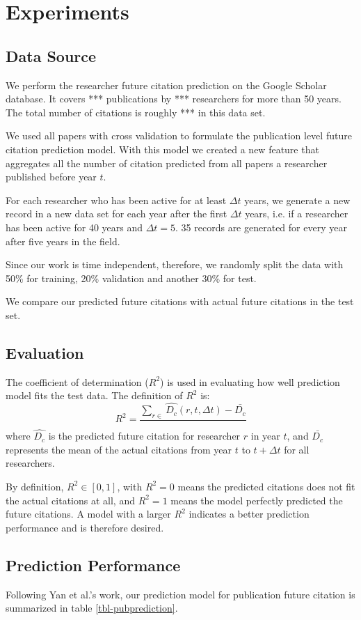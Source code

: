 \section{Experiments}
\subsection{Data Source}
We perform the researcher future citation prediction on the Google Scholar database.
It covers *** publications by *** researchers for more than 50 years.
The total number of citations is roughly *** in this data set.

We used all papers with cross validation to formulate the publication level future citation prediction model.
With this model we created a new feature that aggregates all the number of citation predicted from all papers a researcher published before year $t$.

For each researcher who has been active for at least $\Delta t$ years, we generate a new record in a new data set for each year after the first $\Delta t$ years, i.e. if a researcher has been active for 40 years and $\Delta t=5$. 35 records are generated for every year after five years in the field. 

Since our work is time independent, therefore, we randomly split the data with 50\% for training, 20\% validation and another 30\% for test. 

We compare our predicted future citations with actual future citations in the test set.

\subsection{Evaluation}
The coefficient of determination ($R^2$) is used in evaluating how well prediction model fits the test data.
The definition of $R^2$ is:
\[R^2=\frac{\sum_{r \in }\hat{D_c}(r,t,\Delta t)-\bar{D_c}}{}\]
where $\hat{D_c}$ is the predicted future citation for researcher $r$ in year $t$, 
and $\bar{D_c}$ represents the mean of the actual citations from year $t$ to $t+\Delta t$ for all researchers.

By definition, $R^2\in [0,1]$, with $R^2=0$ means the predicted citations does not fit the actual citations at all,
and $R^2=1$ means the model perfectly predicted the future citations. A model with a larger $R^2$ indicates a better prediction performance and is therefore desired. 
\subsection{Prediction Performance}
Following Yan et al.'s work, our prediction model for publication future citation is summarized in table \ref{tbl-pubprediction}.


